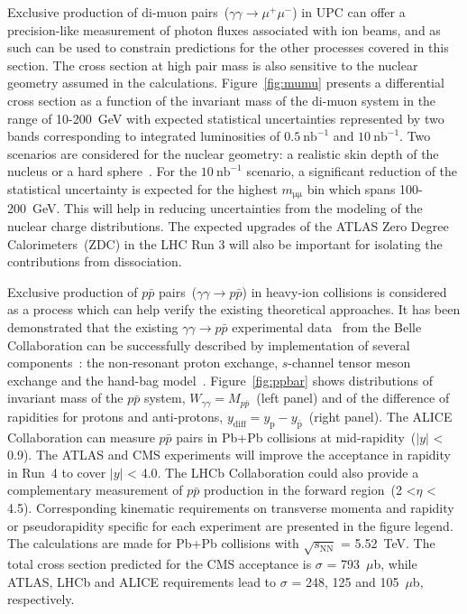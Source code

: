 \documentclass[../report.tex]{subfiles}
\begin{document}
Exclusive production of di-muon pairs~($\gamma\gamma\rightarrow \mu^+\mu^-$) in UPC can offer a precision-like measurement of photon fluxes associated with ion beams, and as such can be used to constrain predictions for the other processes covered in this section. The cross section at high pair mass is also sensitive to the nuclear geometry assumed in the calculations. Figure~\ref{fig:mumu} presents a differential cross section as a function of the invariant mass of the di-muon system in the range of 10-200~GeV with expected statistical uncertainties represented by two bands corresponding to integrated luminosities of $0.5~\mathrm{nb}^{-1}$ and
$10~\mathrm{nb}^{-1}$. Two scenarios are considered for the nuclear
geometry: a realistic skin depth of the nucleus or a hard sphere~\cite{Barrett:1977}.
For the $10~\mathrm{nb}^{-1}$ scenario, a significant reduction of the
statistical uncertainty is expected for the highest $m_\mathrm{\mu\mu}$ bin which spans 100-200~GeV.  This will help in reducing uncertainties from the modeling of the nuclear charge distributions.
The expected upgrades of the ATLAS Zero Degree Calorimeters~(ZDC) in the LHC Run 3 will also be important for isolating the contributions from dissociation.

Exclusive production of $p\bar{p}$ pairs~($\gamma\gamma\rightarrow p\bar{p}$) in heavy-ion collisions is considered as a process which can help verify the existing theoretical approaches. It has been demonstrated that the existing $\gamma\gamma\rightarrow p\bar{p}$ experimental data~\cite{Kuo:2005nr} from the Belle Collaboration can be successfully described by implementation of several components~\cite{Klusek-Gawenda:2017lgt}: the non-resonant proton exchange, $s$-channel tensor meson exchange and the hand-bag model~\cite{Diehl:2002yh}. Figure~\ref{fig:ppbar} shows distributions of invariant mass of the $p\bar{p}$ system, $W_{\gamma\gamma} = M_{p\bar{p}}$~(left panel) and of the difference
of rapidities for protons and anti-protons, $y_{\mathrm{diff}} = y_\mathrm{p} - y_{\mathrm{\bar{p}}}$~(right panel).
The ALICE Collaboration can measure $p\bar{p}$ pairs in Pb+Pb collisions at mid-rapidity~($|y|$ < 0.9). The ATLAS and CMS experiments will improve the acceptance in rapidity in Run~4 to cover $|y|$ < 4.0.
The LHCb Collaboration could also provide a complementary measurement of $p\bar{p}$ production in the forward region~(2 <$\eta$ < 4.5).  Corresponding kinematic requirements on transverse momenta and rapidity or pseudorapidity specific for each experiment are presented in the figure legend. The calculations are made for Pb+Pb collisions with $\sqrt{s_{\mathrm{NN}}}$ = 5.52~TeV.
The total cross section predicted for the CMS acceptance is $\sigma$ = 793~$\mu$b, while ATLAS, LHCb and ALICE requirements lead to $\sigma$ = 248, 125 and 105~$\mu$b, respectively.
\end{document}
